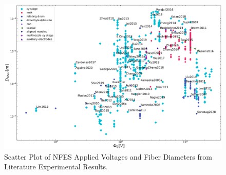 \begin{figure}[!th]
\centering
\includegraphics[width=\textwidth]{./Figures/plt_Phi0V_vs_Dfiberm.png}
\decoRule
\caption[Scatter Plot of NFES Applied Voltages and Fiber Diameters from Literature Experimental Results]{Scatter Plot of NFES Applied Voltages and Fiber Diameters from Literature Experimental Results. \cite{
  Yang2019,Fattahi2017,Shin2019,Wang2015,Parajuli2016,Zheng2010,Fuh2011,Dalton2015,
  Ru2014,Xue2014,Wang2017,Xu2014,Liu2013,Pan2014,Canton2014,Chakraborty2009,Gupta2007,
  He2018,Zhou2011,Chen2013,Williams2018,Choi2017,Pan2019,Lei2015,Lim2019,Park2020,
  Fuh2012,Flores2017,Chang2010,Xu2019,Zhang2019,Shin2018,Fuh2015,Nagle2019,Zheng2012,
  Kameoka2003a,Liu2014,E.King2019,Hochleitner2017,Madou2011,Jiang2018,Husain2016,
  ElectrospinTech2015,Brown2011,Kolan2018,Chang2011,Beachley2011,Camillo2013,Kameoka2003,
  Bu2012,Lee2012,Huang2015,Coppola2020,CisquellaSerra2019,Ruggieri2013,Hochleitner2014,
  Zhu2016,Brown2014,Chang2008,Sonntag2020,Kim2018,Deng2020,Han2019,George2020,Sun2006a,
  Pan2015,Shen2016,Strauss2019,Fuh2013,Sarkar2007,You2017,Wang2018a,Zheng2014,Song2015,
  GaofengZheng2010,Liu2015a,Min2013,Luo2016,Yousefi2019,Cardenas2017,Coppola2014}}
\label{fig:plt_Phi0V_vs_Dfiberm}
\end{figure}



